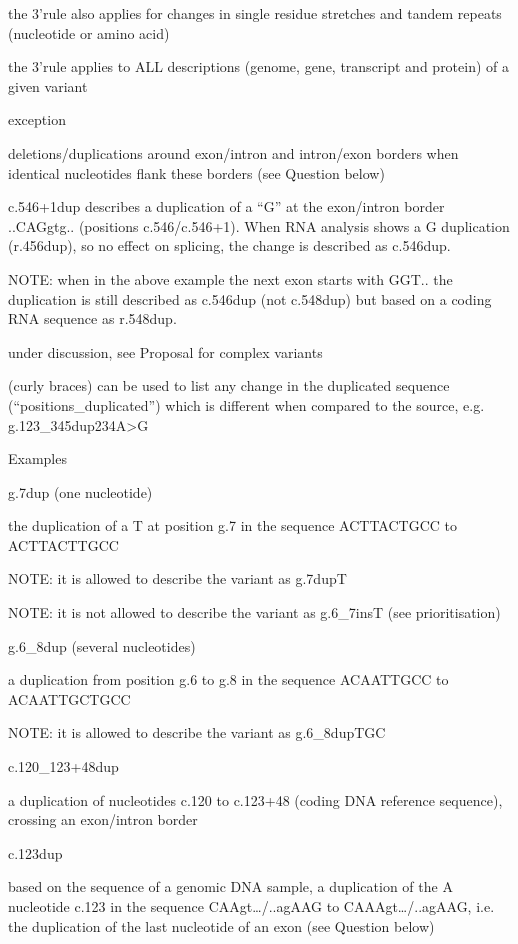 \documentclass{book}
\begin{document}
	the 3’rule also applies for changes in single residue stretches and tandem repeats (nucleotide or amino acid)

	the 3’rule applies to ALL descriptions (genome, gene, transcript and protein) of a given variant

	exception

	deletions/duplications around exon/intron and intron/exon borders when identical nucleotides flank these borders (see Question below)

	c.546+1dup describes a duplication of a “G” at the exon/intron border ..CAGgtg.. (positions c.546/c.546+1). When RNA analysis shows a G duplication (r.456dup), so no effect on splicing, the change is described as c.546dup.

	NOTE: when in the above example the next exon starts with GGT.. the duplication is still described as c.546dup (not c.548dup) but based on a coding RNA sequence as r.548dup.

	under discussion, see Proposal for complex variants

	{ } (curly braces) can be used to list any change in the duplicated sequence (“positions\_duplicated”) which is different when compared to the source, e.g. g.123\_345dup{234A>G}

	

	

	Examples

	g.7dup (one nucleotide)

	the duplication of a T at position g.7 in the sequence ACTTACTGCC to ACTTACTTGCC

	NOTE: it is allowed to describe the variant as g.7dupT

	NOTE: it is not allowed to describe the variant as g.6\_7insT (see prioritisation)

	g.6\_8dup (several nucleotides)

	a duplication from position g.6 to g.8 in the sequence ACAATTGCC to ACAATTGCTGCC

	NOTE: it is allowed to describe the variant as g.6\_8dupTGC

	c.120\_123+48dup

	a duplication of nucleotides c.120 to c.123+48 (coding DNA reference sequence), crossing an exon/intron border

	c.123dup

	based on the sequence of a genomic DNA sample, a duplication of the A nucleotide c.123 in the sequence CAAgt…/..agAAG to CAAAgt…/..agAAG, i.e. the duplication of the last nucleotide of an exon (see Question below)
\end{document}
